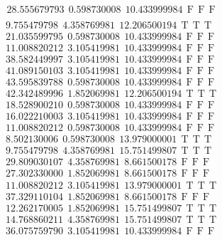 \documentclass[10pt,a4paper]{article}
\begin{document}
\begin{itemize}
\begin{displaymath}
{\begin{aligned}
&28.555679793 ~~   0.598730008 ~~  10.433999984  ~~\mathrm{F  ~~ F  ~~  F} \\ 
				\end{aligned}
			}
		\end{displaymath}
		\begin{displaymath}
			\boxed{
				\begin{aligned}
& 9.755479798 ~~   4.358769981 ~~  12.206500194  ~~\mathrm{T  ~~ T  ~~ T } \\ 
&21.035599795 ~~   0.598730008 ~~  10.433999984  ~~\mathrm{F  ~~ F  ~~  F} \\ 
&11.008820212 ~~   3.105419981 ~~  10.433999984  ~~\mathrm{F  ~~ F  ~~  F} \\ 
&38.582449997 ~~   3.105419981 ~~  10.433999984  ~~\mathrm{F  ~~ F  ~~  F} \\ 
&41.089150103 ~~   3.105419981 ~~  10.433999984  ~~\mathrm{F  ~~ F  ~~  F} \\ 
&43.595839788 ~~   0.598730008 ~~  10.433999984  ~~\mathrm{F  ~~ F  ~~  F} \\ 
&42.342489996 ~~   1.852069981 ~~  12.206500194  ~~\mathrm{T  ~~ T  ~~ T } \\ 
&18.528900210 ~~   0.598730008 ~~  10.433999984  ~~\mathrm{F  ~~ F  ~~  F} \\ 
&16.022210003 ~~   3.105419981 ~~  10.433999984  ~~\mathrm{F  ~~ F  ~~  F} \\ 
&11.008820212 ~~   0.598730008 ~~  10.433999984  ~~\mathrm{F  ~~ F  ~~  F} \\ 
& 8.502130006 ~~   0.598730008 ~~  13.979000001  ~~\mathrm{T  ~~ T  ~~ T } \\ 
& 9.755479798 ~~   4.358769981 ~~  15.751499807  ~~\mathrm{T  ~~ T  ~~ T } \\ 
&29.809030107 ~~   4.358769981 ~~   8.661500178  ~~\mathrm{F  ~~ F  ~~  F} \\ 
&27.302330000 ~~   1.852069981 ~~   8.661500178  ~~\mathrm{F  ~~ F  ~~  F} \\ 
&11.008820212 ~~   3.105419981 ~~  13.979000001  ~~\mathrm{T  ~~ T  ~~ T } \\ 
&37.329110104 ~~   1.852069981 ~~   8.661500178  ~~\mathrm{F  ~~ F  ~~  F} \\ 
&12.262170005 ~~   1.852069981 ~~  15.751499807  ~~\mathrm{T  ~~ T  ~~ T } \\ 
&14.768860211 ~~   4.358769981 ~~  15.751499807  ~~\mathrm{T  ~~ T  ~~ T } \\ 
&36.075759790 ~~   3.105419981 ~~  10.433999984  ~~\mathrm{F  ~~ F  ~~  F} \\ 

\end{aligned}}
\end{displaymath}
\end{itemize}
\end{document}
